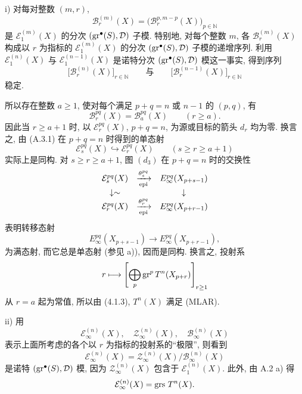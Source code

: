 \begin{prooftext}
i) 对每对整数 \((m,r)\),
\[
\mathcal B_r^{(m)}(X)=\bigl(\mathcal B_r^{p,m-p}(X)\bigr)_{p\in\mathbb N}
\]
是 \(\mathcal E_1^{(m)}(X)\) 的分次 \((\operatorname{gr}^\bullet(S),\mathcal D)\) 子模. 特别地, 对每个整数 \(m\), 各 \(\mathcal B_r^{(m)}(X)\) 构成以 \(r\) 为指标的 \(\mathcal E_1^{(m)}(X)\) 的分次 \((\operatorname{gr}^\bullet(S),\mathcal D)\) 子模的递增序列. 利用 \(\mathcal E_1^{(n)}(X)\) 与 \(\mathcal E_1^{(n-1)}(X)\) 是诺特分次 \((\operatorname{gr}^\bullet(S),\mathcal D)\) 模这一事实, 得到序列
\[
\bigl[\mathcal B_r^{(n)}(X)\bigr]_{r\in\mathbb N}
\qquad\text{与}\qquad
\bigl[\mathcal B_r^{(n-1)}(X)\bigr]_{r\in\mathbb N}
\]
稳定.

所以存在整数 \(a\ge1\), 使对每个满足 \(p+q=n\) 或 \(n-1\) 的 \((p,q)\), 有
\begin{equation}
\mathcal B_r^{pq}(X)=\mathcal B_a^{pq}(X)\qquad(r\ge a).
\tag{A.3.1}
\end{equation}
因此当 \(r\ge a+1\) 时, 以 \(\mathcal E_r^{pq}(X)\), \(p+q=n\), 为源或目标的箭头 \(d_r\) 均为零. 换言之, 由 (A.3.1) 在 \(p+q=n\) 时得到的单态射
\[
\mathcal E_s^{pq}(X)\hookrightarrow\mathcal E_r^{pq}(X)\qquad(s\ge r\ge a+1)
\]
实际上是同构. 对 \(s\ge r\ge a+1\), 图 \((d_3)\) 在 \(p+q=n\) 时的交换性
\[
\begin{array}{ccc}
\mathcal E_s^{pq}(X)&\xrightarrow[\operatorname{epi}]{\theta_s^{pq}}&E_\infty^{pq}(X_{p+s-1})\\
\downarrow\sim&&\downarrow\\
\mathcal E_r^{pq}(X)&\xrightarrow[\operatorname{epi}]{\theta_r^{pq}}&E_\infty^{pq}(X_{p+r-1})
\end{array}
\]
表明转移态射
\[
E_\infty^{pq}(X_{p+s-1})\longrightarrow E_\infty^{pq}(X_{p+r-1}),
\]
为满态射, 而它总是单态射 (参见 a)), 因而是同构. 换言之, 投射系
\[
r\longmapsto\left[\bigoplus_p\operatorname{gr}^p T^n(X_{p+r})\right]_{r\ge1}
\]
从 \(r=a\) 起为常值, 所以由 (4.1.3), \(T^n(X)\) 满足 (MLAR).

ii) 用
\[
\mathcal E_\infty^{(n)}(X),\quad
\mathcal Z_\infty^{(n)}(X),\quad
\mathcal B_\infty^{(n)}(X)
\]
表示上面所考虑的各个以 \(r\) 为指标的投射系的``极限'', 则看到
\[
\mathcal E_\infty^{(n)}(X)=
\mathcal Z_\infty^{(n)}(X)/\mathcal B_\infty^{(n)}(X)
\]
是诺特 \((\operatorname{gr}^\bullet(S),\mathcal D)\) 模, 因为 \(\mathcal Z_\infty^{(n)}(X)\) 包含于 \(\mathcal E_1^{(n)}(X)\). 此外, 由 A.2 a) 得
\[
\mathcal E_\infty^{(n)}(X)=\operatorname{grs}\,T^n(X).
\]
\end{prooftext}

\clearpage{}

